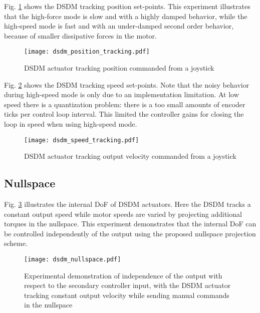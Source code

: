 Fig. \ref{fig:dsdm_position_tracking} shows the DSDM tracking position set-points. This experiment illustrates that the high-force mode is slow and with a highly damped behavior, while the high-speed mode is fast and with an under-damped second order behavior, because of smaller dissipative forces in the motor. 
%
\begin{figure}[H]
	\centering
		\texttt{[image: dsdm\_position\_tracking.pdf]}
		\vspace{-10pt}
	\caption[DSDM actuator position control]{DSDM actuator tracking position commanded from a joystick }
	\label{fig:dsdm_position_tracking}
\end{figure}
%
Fig. \ref{fig:dsdm_speed_tracking} shows the DSDM tracking speed set-points. Note that the noisy behavior during high-speed mode is only due to an implementation limitation. At low speed there is a quantization problem: there is a too small amounts of encoder ticks per control loop interval. This limited the controller gains for closing the loop in speed when using high-speed mode.
%
\begin{figure}[htb]
	\centering
		\texttt{[image: dsdm\_speed\_tracking.pdf]}
		\vspace{-10pt}
	\caption[DSDM actuator velocity control]{DSDM actuator tracking output velocity commanded from a joystick }
	\label{fig:dsdm_speed_tracking}
	\vspace{-10pt}
\end{figure}


\subsection{Nullspace}

Fig. \ref{fig:dsdm_nullspace} illustrates the internal DoF of DSDM actuators. Here the DSDM tracks a constant output speed while motor speeds are varied by projecting additional torques in the nullspace. This experiment demonstrates that the internal DoF can be controlled independently of the output using the proposed nullspace projection scheme. 
%
\begin{figure}[htb]
	\centering
		\texttt{[image: dsdm\_nullspace.pdf]}
		\vspace{-10pt}
	\caption[DSDM actuator nullspace]{Experimental demonstration of independence of the output with respect to the secondary controller input, with the DSDM actuator tracking constant output velocity while sending manual commands in the nullspace }
	\label{fig:dsdm_nullspace}
	\vspace{-10pt}
\end{figure}


